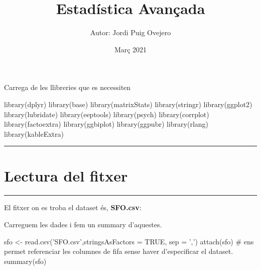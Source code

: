 \documentclass[
]{article}
\title{Estadística Avançada}
\author{Autor: Jordi Puig Ovejero}
\date{Març 2021}
\newenvironment{Shaded}{\begin{snugshade}}{\end{snugshade}}
\newcommand{\CommentTok}[1]{\textcolor[rgb]{0.50,0.62,0.50}{#1}}
\newcommand{\DataTypeTok}[1]{\textcolor[rgb]{0.87,0.87,0.75}{#1}}
\newcommand{\KeywordTok}[1]{\textcolor[rgb]{0.94,0.87,0.69}{#1}}
\newcommand{\NormalTok}[1]{\textcolor[rgb]{0.80,0.80,0.80}{#1}}
\newcommand{\OtherTok}[1]{\textcolor[rgb]{0.94,0.94,0.56}{#1}}
\newcommand{\StringTok}[1]{\textcolor[rgb]{0.80,0.58,0.58}{#1}}
\begin{document}
\maketitle

{
\setcounter{tocdepth}{2}
\tableofcontents
}
Carrega de les llibreries que es necessiten

\begin{Shaded}
\begin{Highlighting}[]
\KeywordTok{library}\NormalTok{(dplyr)}
\KeywordTok{library}\NormalTok{(base)}
\KeywordTok{library}\NormalTok{(matrixStats)}
\KeywordTok{library}\NormalTok{(stringr)}
\KeywordTok{library}\NormalTok{(ggplot2)}
\KeywordTok{library}\NormalTok{(lubridate)}
\KeywordTok{library}\NormalTok{(eeptools)}
\KeywordTok{library}\NormalTok{(psych)}
\KeywordTok{library}\NormalTok{(corrplot)}
\KeywordTok{library}\NormalTok{(factoextra)}
\KeywordTok{library}\NormalTok{(ggbiplot)}
\KeywordTok{library}\NormalTok{(ggpubr)}
\KeywordTok{library}\NormalTok{(rlang)}
\KeywordTok{library}\NormalTok{(kableExtra)}
\end{Highlighting}
\end{Shaded}

\begin{center}\rule{0.5\linewidth}{0.5pt}\end{center}

\hypertarget{lectura-del-fitxer}{%
\section{Lectura del fitxer}\label{lectura-del-fitxer}}

\begin{center}\rule{0.5\linewidth}{0.5pt}\end{center}

El fitxer on es troba el dataset és, \textbf{SFO.csv}:

Carreguem les dades i fem un summary d'aquestes.

\begin{Shaded}
\begin{Highlighting}[]
\NormalTok{sfo <-}\StringTok{ }\KeywordTok{read.csv}\NormalTok{(}\StringTok{'SFO.csv'}\NormalTok{,}\DataTypeTok{stringsAsFactors =} \OtherTok{TRUE}\NormalTok{, }\DataTypeTok{sep =} \StringTok{','}\NormalTok{)}
\KeywordTok{attach}\NormalTok{(sfo) }\CommentTok{# ens permet referenciar les columnes de fifa sense haver d'especificar el dataset.}
\KeywordTok{summary}\NormalTok{(sfo)}
\end{Highlighting}
\end{Shaded}
\end{document}
